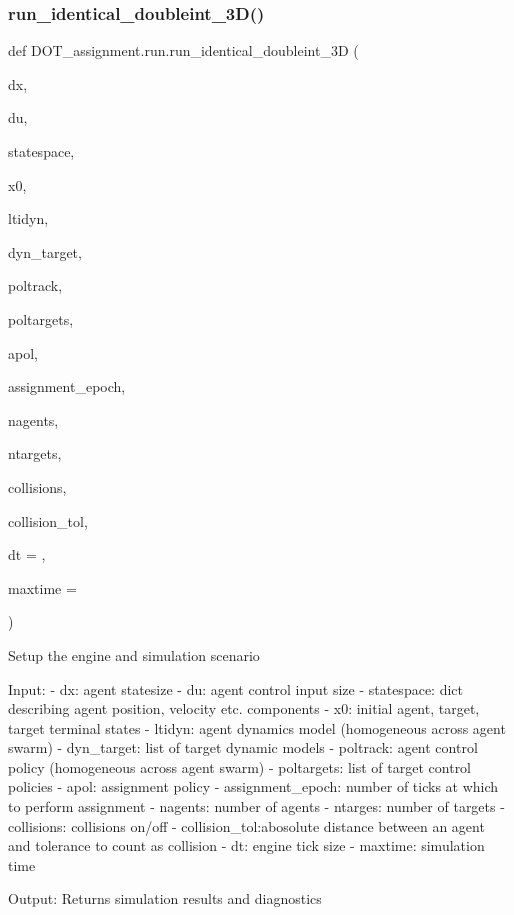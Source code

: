 \subsubsection{\texorpdfstring{run\_identical\_doubleint\_3D()}{run\_identical\_doubleint\_3D()}}
{\footnotesize\ttfamily def D\+O\+T\+\_\+assignment.\+run.\+run\+\_\+identical\+\_\+doubleint\+\_\+3D (\begin{DoxyParamCaption}\item[{}]{dx,  }\item[{}]{du,  }\item[{}]{statespace,  }\item[{}]{x0,  }\item[{}]{ltidyn,  }\item[{}]{dyn\+\_\+target,  }\item[{}]{poltrack,  }\item[{}]{poltargets,  }\item[{}]{apol,  }\item[{}]{assignment\+\_\+epoch,  }\item[{}]{nagents,  }\item[{}]{ntargets,  }\item[{}]{collisions,  }\item[{}]{collision\+\_\+tol,  }\item[{}]{dt = {},  }\item[{}]{maxtime = {} }\end{DoxyParamCaption})}

\begin{DoxyVerb}Setup the engine and simulation scenario

Input:
    - dx:           agent statesize
    - du:           agent control input size
    - statespace:   dict describing agent position, velocity etc. components
    - x0:           initial agent, target, target terminal states
    - ltidyn:       agent dynamics model (homogeneous across agent swarm)
    - dyn_target:   list of target dynamic models
    - poltrack:     agent control policy (homogeneous across agent swarm)
    - poltargets:   list of target control policies
    - apol:         assignment policy
    - assignment_epoch: number of ticks at which to perform assignment
    - nagents:      number of agents
    - ntarges:      number of targets
    - collisions:   collisions on/off
    - collision_tol:abosolute distance between an agent and tolerance to count as collision
    - dt:           engine tick size
    - maxtime:      simulation time

Output: Returns simulation results and diagnostics\end{DoxyVerb}
 \mbox{\label{namespace_d_o_t__assignment_1_1run_a92c3a0505db2434203e6b5625afe42b0}} 
